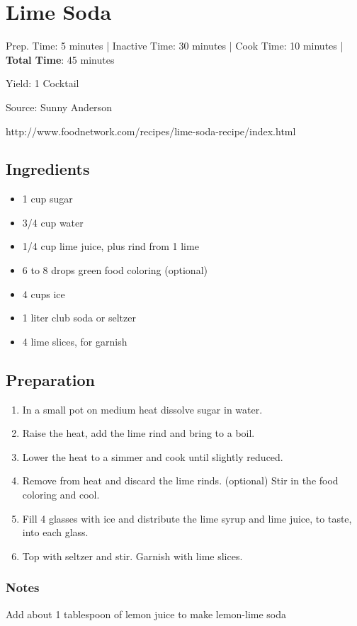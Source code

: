 \section{Lime Soda}

\begin{center}
Prep. Time: 5 minutes |
Inactive Time: 30 minutes |
Cook Time: 10 minutes |
\textbf{Total Time}: 45 minutes

Yield: 1 Cocktail
\end{center}

Source: Sunny Anderson
\begin{center}
http://www.foodnetwork.com/recipes/lime-soda-recipe/index.html
\end{center}

\subsection{Ingredients}
\begin{itemize}
    \item 1 cup sugar
    \item 3/4 cup water
    \item 1/4 cup lime juice, plus rind from 1 lime
    \item 6 to 8 drops green food coloring (optional)
    \item 4 cups ice
    \item 1 liter club soda or seltzer
    \item 4 lime slices, for garnish
\end{itemize}

\subsection{Preparation}
\begin{enumerate}
    \item In a small pot on medium heat dissolve sugar in water.
    \item Raise the heat, add the lime rind and bring to a boil.
    \item Lower the heat to a simmer and cook until slightly reduced.
    \item Remove from heat and discard the lime rinds. (optional) Stir in the food coloring and cool.

    \vspace{3em}

    \item Fill 4 glasses with ice and distribute the lime syrup and lime juice, to taste, into each glass.
    \item Top with seltzer and stir. Garnish with lime slices.
\end{enumerate}

\subsubsection{Notes}

Add about 1 tablespoon of lemon juice to make lemon-lime soda
